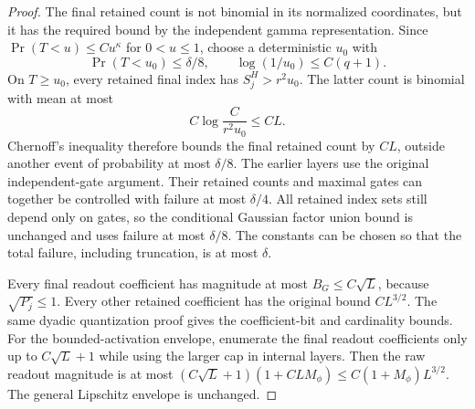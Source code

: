 \begin{proof}
The final retained count is not binomial in its normalized coordinates, but it has the required bound by the independent gamma representation. Since
$\Pr(T<u)\le C u^\kappa$ for $0<u\le1$, choose a deterministic $u_0$ with
\[
 \Pr(T<u_0)\le\delta/8,\qquad
 \log(1/u_0)\le C(q+1).
\]
On $T\ge u_0$, every retained final index has $S_j^H>r^2u_0$. The latter count is binomial with mean at most
\[
 C\log\frac C{r^2u_0}\le CL.
\]
Chernoff's inequality therefore bounds the final retained count by $CL$, outside another event of probability at most $\delta/8$. The earlier layers use the original independent-gate argument. Their retained counts and maximal gates can together be controlled with failure at most $\delta/4$. All retained index sets still depend only on gates, so the conditional Gaussian factor union bound is unchanged and uses failure at most $\delta/8$. The constants can be chosen so that the total failure, including truncation, is at most $\delta$.

Every final readout coefficient has magnitude at most $B_G\le C\sqrt L$, because $\sqrt{P_j}\le1$. Every other retained coefficient has the original bound $CL^{3/2}$. The same dyadic quantization proof gives the coefficient-bit and cardinality bounds. For the bounded-activation envelope, enumerate the final readout coefficients only up to $C\sqrt L+1$ while using the larger cap in internal layers. Then the raw readout magnitude is at most
$(C\sqrt L+1)(1+CLM_\phi)\le C(1+M_\phi)L^{3/2}$. The general Lipschitz envelope is unchanged.
\end{proof}
